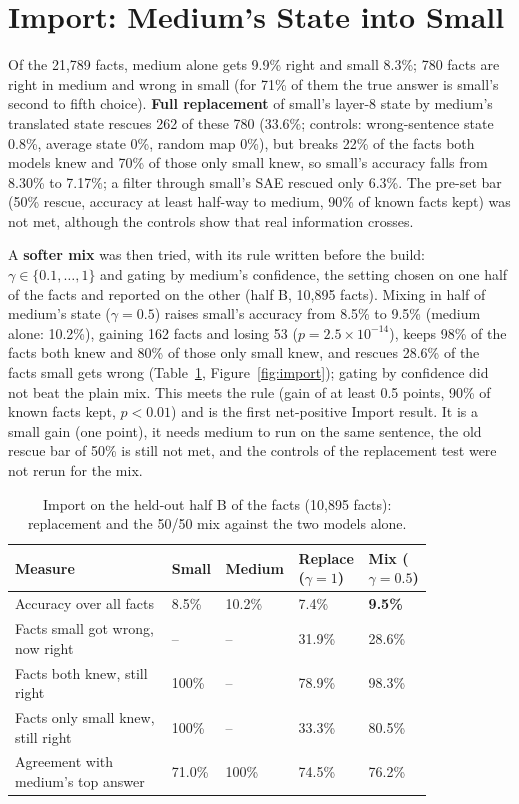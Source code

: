 \section{Import: Medium's State into Small}\label{sec:import}

Of the 21,789 facts, medium alone gets 9.9\% right and small 8.3\%; 780 facts are right in medium and wrong in small (for 71\% of them the true answer is small's second to fifth choice). \textbf{Full replacement} of small's layer-8 state by medium's translated state rescues 262 of these 780 (33.6\%; controls: wrong-sentence state 0.8\%, average state 0\%, random map 0\%), but breaks 22\% of the facts both models knew and 70\% of those only small knew, so small's accuracy falls from 8.30\% to 7.17\%; a filter through small's SAE rescued only 6.3\%. The pre-set bar (50\% rescue, accuracy at least half-way to medium, 90\% of known facts kept) was not met, although the controls show that real information crosses.

A \textbf{softer mix} was then tried, with its rule written before the build: $\gamma\in\{0.1,\dots,1\}$ and gating by medium's confidence, the setting chosen on one half of the facts and reported on the other (half B, 10,895 facts). Mixing in half of medium's state ($\gamma=0.5$) raises small's accuracy from 8.5\% to 9.5\% (medium alone: 10.2\%), gaining 162 facts and losing 53 ($p=2.5\times10^{-14}$), keeps 98\% of the facts both knew and 80\% of those only small knew, and rescues 28.6\% of the facts small gets wrong (Table~\ref{tab:import}, Figure~\ref{fig:import}); gating by confidence did not beat the plain mix. This meets the rule (gain of at least 0.5 points, 90\% of known facts kept, $p<0.01$) and is the first net-positive Import result. It is a small gain (one point), it needs medium to run on the same sentence, the old rescue bar of 50\% is still not met, and the controls of the replacement test were not rerun for the mix.

\begin{table}[t]
\centering\small
\caption{Import on the held-out half B of the facts (10,895 facts): replacement and the 50/50 mix against the two models alone.}\label{tab:import}
\begin{tabular}{|p{0.37\linewidth}|p{0.10\linewidth}|p{0.11\linewidth}|p{0.14\linewidth}|p{0.11\linewidth}|}
\hline
\textbf{Measure} & \textbf{Small} & \textbf{Medium} & \textbf{Replace} ($\gamma=1$) & \textbf{Mix} ($\gamma=0.5$)\\ \hline
Accuracy over all facts & 8.5\% & 10.2\% & 7.4\% & \textbf{9.5\%}\\ \hline
Facts small got wrong, now right & -- & -- & 31.9\% & 28.6\%\\ \hline
Facts both knew, still right & 100\% & -- & 78.9\% & 98.3\%\\ \hline
Facts only small knew, still right & 100\% & -- & 33.3\% & 80.5\%\\ \hline
Agreement with medium's top answer & 71.0\% & 100\% & 74.5\% & 76.2\%\\ \hline
\end{tabular}
\end{table}

